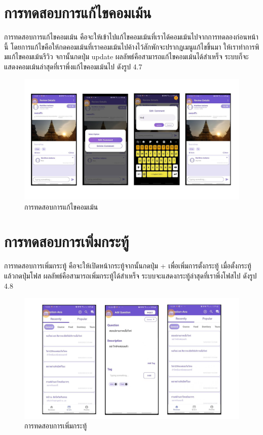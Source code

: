 \section{การทดสอบการแก้ไขคอมเม้น}
\quad \quad การทดสอบการแก้ไขคอมเม้น คือจะให้เข้าไปแก้ไขคอมเม้นที่เราได้คอมเม้นไปจากการทดลองก่อนหน้านี้ โดยการแก้ไขคือให้กดคอมเม้นที่เราคอมเม้นไปค้างไว้สักพักจะปรากฎเมนูแก้ไขขึ้นมา
ให้เราทำการพิมแก้ไขคอมเม้นรีวิว จกานั้นกดปุ่ม update ผลลัพธ์คือสามารถแก้ไขคอมเม้นได้สำเหร็จ ระบบก็จะแสดงคอมเม้นล่าสุดที่เราพึ่งแก้ไขคอมเม้นไป ดังรูป 4.7 

\begin{figure}
    \begin{center}
      \includegraphics[width=1\textwidth]{./image/testing/Slide8.JPG}
    \end{center}
    \caption[การทดสอบการแก้ไขคอมเม้น]{การทดสอบการแก้ไขคอมเม้น}
    \end{figure}
    
\section{การทดสอบการเพิ่มกระทู้}
\quad \quad การทดสอบการเพิ่มกระทู้ คือจะให้เปิดหน้ากระทู้จากนั้นกดปุ่ม + เพื่อเพิ่มการตั้งกระทู้ เมื่อตั้งกระทู้แล้วกดปุ่มโฟส 
ผลลัพธ์คือสามารถเพิ่มกระทู้ได้สำเหร็จ ระบบจะแสดงกระทู้ล่าสุดที่เราพึ่งโฟสไป  ดังรูป 4.8

\begin{figure}
    \begin{center}
      \includegraphics[width=1\textwidth]{./image/testing/Slide9.JPG}
    \end{center}
    \caption[การทดสอบการเพิ่มกระทู้]{การทดสอบการเพิ่มกระทู้}
    \end{figure}

